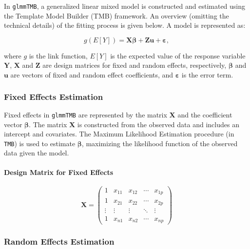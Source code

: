 \documentclass[12pt, twoside,hidelinks]{article}
\theoremstyle{definition}
\numberwithin{equation}{section}
\begin{document}
In \texttt{glmmTMB}, a generalized linear mixed model is constructed and estimated using the Template Model Builder (TMB) framework. An overview (omitting the technical details) of the fitting process is given below. A model is represented as:

\begin{equation}
g(E[Y]) = \mathbf{X} \boldsymbol{\beta} + \mathbf{Z}\boldsymbol{u} + \boldsymbol{\varepsilon},
\label{eq:linkglmm}
\end{equation}

where \( g \) is the link function, \( E[Y] \) is the expected value of the response variable \( \mathbf{Y} \), \( \mathbf{X} \) and \( \mathbf{Z} \) are design matrices for fixed and random effects, respectively, \( \boldsymbol{\beta} \) and \( \boldsymbol{u} \) are vectors of fixed and random effect coefficients, and \( \boldsymbol{\varepsilon} \) is the error term.

\subsubsection{Fixed Effects Estimation}

Fixed effects in \texttt{glmmTMB} are represented by the matrix \( \mathbf{X} \) and the coefficient vector \( \boldsymbol{\beta} \). The matrix \( \mathbf{X} \) is constructed from the observed data and includes an intercept and covariates. The Maximum Likelihood Estimation   procedure (in \texttt{TMB}) is used to estimate \( \boldsymbol{\beta} \), maximizing the likelihood function of the observed data given the model.

\paragraph{Design Matrix for Fixed Effects}

\begin{equation}
\mathbf{X} = \begin{pmatrix}
1 & x_{11} & x_{12} & \cdots & x_{1p} \\
1 & x_{21} & x_{22} & \cdots & x_{2p} \\
\vdots & \vdots & \vdots & \ddots & \vdots \\
1 & x_{n1} & x_{n2} & \cdots & x_{np}
\end{pmatrix}
\end{equation}

\subsubsection{Random Effects Estimation}
\end{document}
